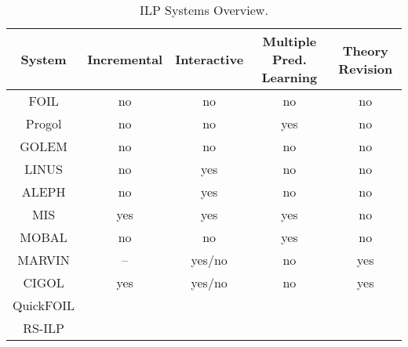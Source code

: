 \begin{table}[t]
\begin{tabular}{|c|c|c|c|c|}
\hline
System & Incremental & Interactive & Multiple Pred. Learning & Theory Revision \\
\hline
FOIL & no & no & no & no \\
Progol & no & no & yes & no \\
GOLEM & no & no & no & no \\
LINUS & no & yes & no & no \\
ALEPH & no & yes & no & no \\
MIS & yes & yes & yes & no \\
MOBAL & no & no & yes & no \\
MARVIN & -- & yes/no & no & yes \\
CIGOL & yes & yes/no & no & yes \\
QuickFOIL &  &  &  & \\ 
RS-ILP &  &  &  & \\
\hline
\end{tabular}
\caption{ILP Systems Overview.}
\label{tab:ilp}
\end{table}